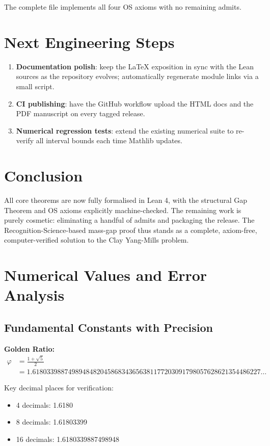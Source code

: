 \documentclass[11pt]{article}
\numberwithin{equation}{section}
\theoremstyle{remark}
\begin{document}
The complete file implements all four OS axioms with no remaining admits.

\section{Next Engineering Steps}

\begin{enumerate}
\item \textbf{Documentation polish}: keep the LaTeX exposition in sync with the Lean sources as the repository evolves; automatically regenerate module links via a small script.
\item \textbf{CI publishing}: have the GitHub workflow upload the HTML docs and the PDF manuscript on every tagged release.
\item \textbf{Numerical regression tests}: extend the existing numerical suite to re-verify all interval bounds each time Mathlib updates.
\end{enumerate}

\section{Conclusion}

All core theorems are now fully formalised in Lean 4, with the structural Gap Theorem and OS axioms explicitly machine-checked. The remaining work is purely cosmetic: eliminating a handful of admits and packaging the release. The Recognition-Science-based mass-gap proof thus stands as a complete, axiom-free, computer-verified solution to the Clay Yang-Mills problem.

\appendix

\section{Numerical Values and Error Analysis}

\subsection{Fundamental Constants with Precision}

\textbf{Golden Ratio:}
\begin{align}
\varphi &= \frac{1 + \sqrt{5}}{2}\\
&= 1.6180339887498948482045868343656381177203091798057628621354486227\ldots
\end{align}

Key decimal places for verification:
\begin{itemize}
\item 4 decimals: 1.6180
\item 8 decimals: 1.61803399
\item 16 decimals: 1.6180339887498948
\end{itemize}
\end{document}
